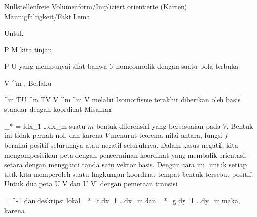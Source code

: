 {Nullstellenfreie Volumenform/Impliziert orientierte (Karten) Mannigfaltigkeit/Fakt}
{Lema}
{}
{

\faktzusatz {}

}
{

Untuk

\mavergleichskette
{\vergleichskette
{ P
}
{ \in }{ M
}
{  }{
}
{    }{
}
{   }{
}
}
{}{}{}
kita tinjau

\mavergleichskette
{\vergleichskette
{ P
}
{ \in }{ U
}
{  }{
}
{    }{
}
{   }{
}
}
{}{}{}
yang mempunyai sifat bahwa $U$ homeomorfik dengan suatu bola terbuka

\mavergleichskette
{\vergleichskette
{ V
}
{ \subseteq }{ \R^m
}
{  }{
}
{    }{
}
{   }{
}
}
{}{}{.}
Berlaku

\mavergleichskettedisp
{\vergleichskette
{ \bigwedge^m TU
}
{ \cong} { \bigwedge^m TV
}
{ \cong} { V \times \bigwedge^m \R^m
}
{ \cong} { V \times \R
}
{ } {
}
}
{}{}{}
melalui
 Isomorfisme terakhir diberikan oleh basis standar dengan koordinat
 Misalkan

\mavergleichskette
{\vergleichskette
{ \alpha_* \omega
}
{ = }{ fdx_1 \wedge \ldots \wedge dx_m
}
{  }{
}
{    }{
}
{   }{
}
}
{}{}{}
suatu $m$-bentuk diferensial yang bersesuaian pada $V$. Bentuk ini tidak pernah nol, dan karena $V$
menurut
teorema nilai antara,
fungsi $f$ bernilai positif seluruhnya atau negatif seluruhnya. Dalam kasus negatif, kita mengomposisikan peta dengan pencerminan koordinat yang membalik orientasi, setara dengan mengganti tanda satu vektor basis. Dengan cara ini, untuk setiap titik kita memperoleh suatu lingkungan koordinat tempat bentuk tersebut positif. Untuk dua peta
\maabb {\alpha} { U } { V
} {}
dan
\maabb {\beta} { U } { V'
} {}
dengan pemetaan transisi

\mavergleichskette
{\vergleichskette
{ \psi
}
{ = }{ \beta \circ \alpha^{-1}
}
{  }{
}
{    }{
}
{   }{
}
}
{}{}{}
dan deskripsi lokal
\mathkor {} {\alpha_*\omega =f dx_1 \wedge \ldots \wedge dx_m} {dan} {\beta_*\omega =g dy_1 \wedge \ldots \wedge dy_m} {}
maka, karena

}
